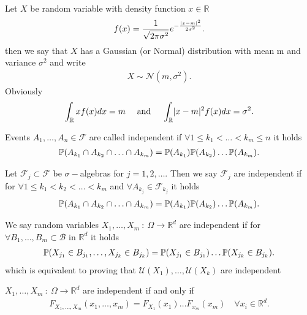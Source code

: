 \begin{example}
 Let $X$ be random variable with density function  $x \in  \mathbb{R}$
 \begin{align*}
 f(x) = \frac{1}{\sqrt{2\pi \sigma ^2}}e^{-\frac{\abs{x-m}^2}{2\sigma ^2}}  
 .\end{align*}
 then we say that $X$ has a Gaussian (or Normal) distribution with mean m and variance $\sigma^2$ and write
 \begin{align*}
  X \sim \mathcal{N}(m,\sigma^2)
 .\end{align*}
 Obviously 
 \begin{align*}
   \int_{\mathbb{R}} xf(x) dx = m \quad \text{ and } \quad \int_{\mathbb{R}}\abs{x-m}^2f(x) dx = \sigma^2
  .\end{align*}
\end{example}
\begin{definition}
  Events $A_{1},\ldots ,A_{n} \in  \mathcal{F}$ are called independent if $\forall 1 \le k_{1} < \ldots  < k_m \le  n$ it holds 
  \begin{align*}
    \P(A_{k_{1}}\cap A_{k_2} \cap \ldots \cap A_{k_m} )=\P(A_{k_{1}})\P(A_{k_{2}})\ldots \P(A_{k_m})
  .\end{align*}
\end{definition}
\begin{definition}
 Let $\mathcal{F}_j \subset  \mathcal{F}$   be $\sigma-$algebras for $j=1,2,\ldots $. Then we say $\mathcal{F}_j$ are independent if 
 for $\forall 1 \le k_{1}<k_{2}<\ldots <k_m$ and $\forall A_{k_j} \in  \mathcal{F}_{k_j}$ it holds
 \begin{align*}
  \P(A_{k_{1}}\cap A_{k_2} \cap \ldots \cap A_{k_m} )=\P(A_{k_{1}})\P(A_{k_{2}})\ldots \P(A_{k_m})
 .\end{align*}
\end{definition}
\begin{definition}
 We say random variables $X_{1},\ldots ,X_m \ : \ \Omega  \to \mathbb{R}^{d} $  are independent if 
 for $\forall  B_{1},\ldots ,B_{m} \subset  \mathcal{B}$ in $\mathbb{R}^{d} $ it holds 
 \begin{align*}
   \P(X_{j_{1}}\in B_{j_{1}},\ldots, X_{j_k}\in B_{j_k} ) = \P(X_{j_{1}} \in  B_{j_{1}})\ldots \P(X_{j_k} \in  B_{j_k})
 .\end{align*}
 which is equivalent to proving that $\mathcal{U}(X_{1}),\ldots ,\mathcal{U}(X_k)$ are independent
\end{definition}
\begin{theorem}
 $X_{1},\ldots ,X_m \ : \ \Omega  \to \mathbb{R}^{d} $ are independent if and only if 
 \begin{align*}
   F_{X_{1},\ldots ,X_m}(x_{1},\ldots ,x_m) =F_{X_{1}}(x_{1})\ldots F_{x_m}(x_m) \quad \forall  x_i \in \mathbb{R}^{d} 
 .\end{align*}
\end{theorem}
